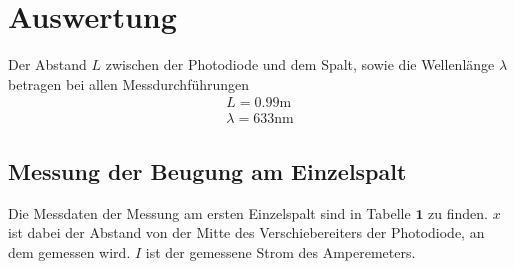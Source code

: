 \section{Auswertung}

Der Abstand $L$ zwischen der Photodiode und dem Spalt, sowie die Wellenlänge $\lambda$ betragen bei allen Messdurchführungen
\begin{gather*}
	L = 0.99 \text{m} \\
	\lambda = 633 \text{nm}
\end{gather*}

\subsection{Messung der Beugung am Einzelspalt}
Die Messdaten der Messung am ersten Einzelspalt sind in Tabelle $\mathbf{1}$ zu finden. $x$ ist dabei der Abstand von der Mitte des Verschiebereiters der Photodiode, an dem gemessen wird. $I$ ist der gemessene Strom des Amperemeters.
